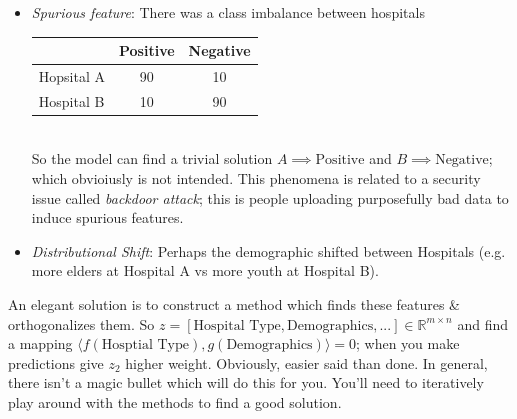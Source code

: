 \begin{itemize}
	\item \emph{Spurious feature}: There was a class imbalance between hospitals
	\begin{table}[h]
	\centering
	\begin{tabular}{lcc}
	\hline
	 & Positive & Negative \\
	\hline
	Hopsital A & 90 & 10 \\
	Hospital B & 10 & 90 \\
	\hline
	\end{tabular}
	\end{table}
	\\
	So the model can find a trivial solution $A \implies \text{Positive}$ and $B \implies \text{Negative}$; which obvioiusly is not intended. This phenomena is related to a security issue called \emph{backdoor attack}; this is people uploading purposefully bad data to induce spurious features.
	
	\item \emph{Distributional Shift}: Perhaps the demographic shifted between Hospitals (e.g. more elders at Hospital A vs more youth at Hospital B).
\end{itemize}
An elegant solution is to construct a method which finds these features \& orthogonalizes them. So $z = [\text{Hospital Type}, \text{Demographics}, ...] \in \mathbb R^{m \times n}$ and find a mapping  $\langle f(\text{Hosptial Type}), g(\text{Demographics}) \rangle = 0$; when you make predictions give $z_{2}$ higher weight. Obviously, easier said than done. In general, there isn't a magic bullet which will do this for you. You'll need to iteratively play around with the methods to find a good solution.

































